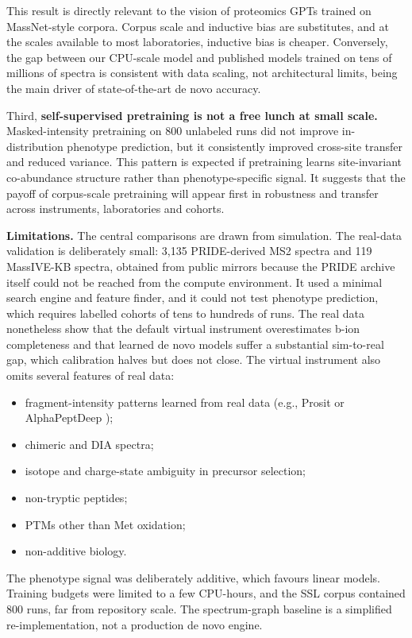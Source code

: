 \documentclass{sn-preview}
\begin{document}
This result is directly relevant to the vision of proteomics GPTs trained on MassNet-style corpora. Corpus scale and inductive bias are substitutes, and at the scales available to most laboratories, inductive bias is cheaper. Conversely, the gap between our CPU-scale model and published models trained on tens of millions of spectra \cite{yilmaz2024,eloff2025} is consistent with data scaling, not architectural limits, being the main driver of state-of-the-art de novo accuracy.

Third, \textbf{self-supervised pretraining is not a free lunch at small scale.} Masked-intensity pretraining on 800 unlabeled runs did not improve in-distribution phenotype prediction, but it consistently improved cross-site transfer and reduced variance. This pattern is expected if pretraining learns site-invariant co-abundance structure rather than phenotype-specific signal. It suggests that the payoff of corpus-scale pretraining will appear first in robustness and transfer across instruments, laboratories and cohorts.

\textbf{Limitations.} The central comparisons are drawn from simulation. The real-data validation is deliberately small: 3,135 PRIDE-derived MS2 spectra and 119 MassIVE-KB spectra, obtained from public mirrors because the PRIDE archive itself could not be reached from the compute environment. It used a minimal search engine and feature finder, and it could not test phenotype prediction, which requires labelled cohorts of tens to hundreds of runs. The real data nonetheless show that the default virtual instrument overestimates b-ion completeness and that learned de novo models suffer a substantial sim-to-real gap, which calibration halves but does not close. The virtual instrument also omits several features of real data:

\begin{itemize}
\item
  fragment-intensity patterns learned from real data (e.g., Prosit or AlphaPeptDeep \cite{gessulat2019,zeng2022});
\item
  chimeric and DIA spectra;
\item
  isotope and charge-state ambiguity in precursor selection;
\item
  non-tryptic peptides;
\item
  PTMs other than Met oxidation;
\item
  non-additive biology.
\end{itemize}

The phenotype signal was deliberately additive, which favours linear models. Training budgets were limited to a few CPU-hours, and the SSL corpus contained 800 runs, far from repository scale. The spectrum-graph baseline is a simplified re-implementation, not a production de novo engine.
\end{document}
